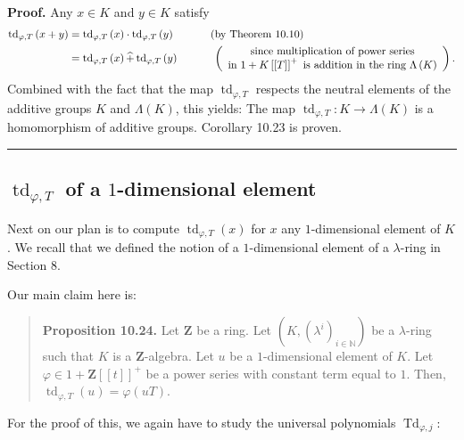 \documentclass[numbers=enddot,12pt,final,onecolumn,notitlepage]{scrartcl}%
\newenvironment{proof}[1][Proof]{\noindent\textbf{#1.} }{\ \rule{0.5em}{0.5em}}
\begin{document}
\begin{proof}
Any $x\in K$ and $y\in K$ satisfy%
\begin{align*}
\operatorname*{td}\nolimits_{\varphi,T}\left(  x+y\right)   &
=\operatorname*{td}\nolimits_{\varphi,T}\left(  x\right)  \cdot
\operatorname*{td}\nolimits_{\varphi,T}\left(  y\right)
\ \ \ \ \ \ \ \ \ \ \left(  \text{by Theorem 10.10}\right) \\
&  =\operatorname*{td}\nolimits_{\varphi,T}\left(  x\right)  \widehat{+}%
\operatorname*{td}\nolimits_{\varphi,T}\left(  y\right)
\ \ \ \ \ \ \ \ \ \ \left(
\begin{array}
[c]{c}%
\text{since multiplication of power series}\\
\text{in }1+K\left[  \left[  T\right]  \right]  ^{+}\text{ is addition in the
ring }\Lambda\left(  K\right)
\end{array}
\right)  .
\end{align*}
Combined with the fact that the map $\operatorname*{td}\nolimits_{\varphi,T}$
respects the neutral elements of the additive groups $K$ and $\Lambda\left(
K\right)  $, this yields: The map $\operatorname*{td}_{\varphi,T}%
:K\rightarrow\Lambda\left(  K\right)  $ is a homomorphism of additive groups.
Corollary 10.23 is proven.
\end{proof}

\subsection{ $\operatorname*{td}_{\varphi,T}$ of a $1$-dimensional element}

Next on our plan is to compute $\operatorname*{td}\nolimits_{\varphi,T}\left(
x\right)  $ for $x$ any $1$-dimensional element of $K$. We recall that we
defined the notion of a $1$-dimensional element of a $\lambda$-ring in Section 8.

Our main claim here is:

\begin{quote}
\textbf{Proposition 10.24.} Let $\mathbf{Z}$ be a ring. Let $\left(  K,\left(
\lambda^{i}\right)  _{i\in\mathbb{N}}\right)  $ be a $\lambda$-ring such that
$K$ is a $\mathbf{Z}$-algebra. Let $u$ be a $1$-dimensional element of $K$.
Let $\varphi\in1+\mathbf{Z}\left[  \left[  t\right]  \right]  ^{+}$ be a power
series with constant term equal to $1$. Then, $\operatorname*{td}%
\nolimits_{\varphi,T}\left(  u\right)  =\varphi\left(  uT\right)  $.
\end{quote}

For the proof of this, we again have to study the universal polynomials
$\operatorname*{Td}\nolimits_{\varphi,j}$:
\end{document}
